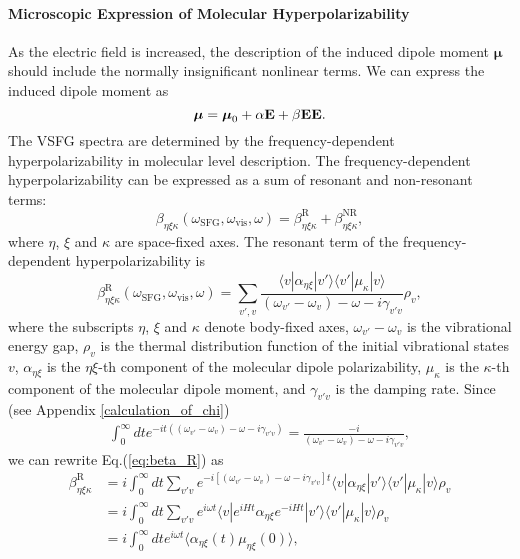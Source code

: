 \paragraph{Microscopic Expression of Molecular Hyperpolarizability} 
As the electric field is increased, the description of the induced dipole moment 
$\boldsymbol \mu$ should include the normally insignificant nonlinear terms. We can express the induced dipole moment as
\begin{equation}
  {\boldsymbol \mu} = {\boldsymbol \mu}_0 +\alpha {\bf E} + \beta {\bf E E}.
\label{eq:induced_mu}
\end{equation}
The VSFG spectra are determined by the frequency-dependent hyperpolarizability in molecular level description. 
The frequency-dependent hyperpolarizability can be expressed as a sum of resonant and non-resonant terms:
\begin{equation}
\beta_{\eta\xi\kappa}(\omega_{\text{SFG}},\omega_{\text{vis}},\omega)=\beta_{\eta\xi\kappa}^{\text{R}}+\beta_{\eta\xi\kappa}^{\text{NR}},
\label{eq:beta}
\end{equation}
where $\eta$, $\xi$ and $\kappa$ are space-fixed axes.
The resonant term of the frequency-dependent hyperpolarizability is 
\begin{equation}
  \beta_{\eta\xi\kappa}^{\text{R}}(\omega_{\text{SFG}},\omega_{\text{vis}},\omega)=\sum_{v',v}\frac{\langle v|\alpha_{\eta\xi}|v'\rangle\langle v'|\mu_{\kappa}|v\rangle}{(\omega_{v'}-\omega_v)-\omega-i\gamma_{v'v}}\rho_v,
\label{eq:beta_R}
\end{equation}
where the subscripts $\eta$, $\xi$ and $\kappa$ denote body-fixed axes,
$\omega_{v'}-\omega_v$ is the vibrational energy gap, 
$\rho_v$ is the thermal distribution function of the initial vibrational states $v$,
$\alpha_{\eta\xi}$ is the $\eta\xi$-th component of the molecular dipole polarizability,
$\mu_{\kappa}$ is the $\kappa$-th component of the molecular dipole moment,
and $\gamma_{v'v}$ is the damping rate.
Since  
(see Appendix \ref{calculation_of_chi}) 
\begin{align}
\int_0^\infty dt e^{-it((\omega_{v'}-\omega_v)-\omega-i\gamma_{v'v})}=\frac{-i}{(\omega_{v'}-\omega_v)-\omega-i\gamma_{v'v}},
\label{integral_identity1a}
\end{align}
we can rewrite Eq.\thinspace(\ref{eq:beta_R}) as 
\begin{align}
  \beta_{\eta\xi\kappa}^{\text{R}}&=i\int_0^\infty dt \sum_{v'v}e^{-i[(\omega_{v'}-\omega_v)-\omega-i\gamma_{v'v}]t} \langle v|\alpha_{\eta\xi}|v'\rangle\langle v'|\mu_{\kappa}|v\rangle \rho_v \nonumber\\
   &=i\int_0^\infty dt \sum_{v'v}e^{i\omega t} \langle v|e^{iHt}\alpha_{\eta\xi}e^{-iHt}|v'\rangle\langle v'|\mu_{\kappa}|v\rangle \rho_v \nonumber\\
   &=i\int_0^\infty dt e^{i\omega t} \langle\alpha_{\eta\xi}(t)\mu_{\eta\xi}(0)\rangle,
\label{eq:beta_R_b}
\end{align}
